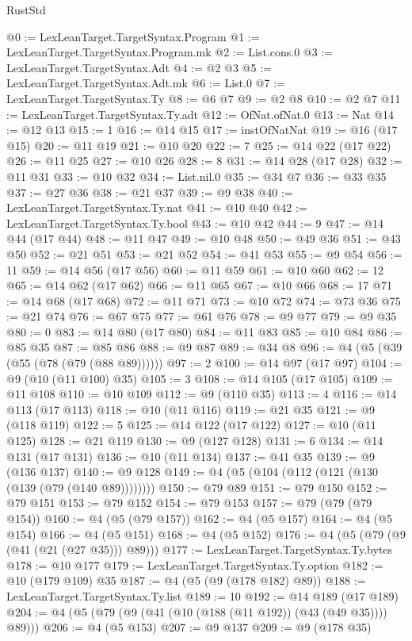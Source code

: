 \begin{lexlean}{RustStd}
\begin{coremodule}
{\begin{coremodule}
{{{{{{{{{{{{{{{{{{{{{{{{{{{{{{{{{@0 := LexLeanTarget.TargetSyntax.Program
@1 := LexLeanTarget.TargetSyntax.Program.mk
@2 := List.cons.{0}
@3 := LexLeanTarget.TargetSyntax.Adt
@4 := @2 @3
@5 := LexLeanTarget.TargetSyntax.Adt.mk
@6 := List.{0}
@7 := LexLeanTarget.TargetSyntax.Ty
@8 := @6 @7
@9 := @2 @8
@10 := @2 @7
@11 := LexLeanTarget.TargetSyntax.Ty.adt
@12 := OfNat.ofNat.{0}
@13 := Nat
@14 := @12 @13
@15 := 1
@16 := @14 @15
@17 := instOfNatNat
@19 := @16 (@17 @15)
@20 := @11 @19
@21 := @10 @20
@22 := 7
@25 := @14 @22 (@17 @22)
@26 := @11 @25
@27 := @10 @26
@28 := 8
@31 := @14 @28 (@17 @28)
@32 := @11 @31
@33 := @10 @32
@34 := List.nil.{0}
@35 := @34 @7
@36 := @33 @35
@37 := @27 @36
@38 := @21 @37
@39 := @9 @38
@40 := LexLeanTarget.TargetSyntax.Ty.nat
@41 := @10 @40
@42 := LexLeanTarget.TargetSyntax.Ty.bool
@43 := @10 @42
@44 := 9
@47 := @14 @44 (@17 @44)
@48 := @11 @47
@49 := @10 @48
@50 := @49 @36
@51 := @43 @50
@52 := @21 @51
@53 := @21 @52
@54 := @41 @53
@55 := @9 @54
@56 := 11
@59 := @14 @56 (@17 @56)
@60 := @11 @59
@61 := @10 @60
@62 := 12
@65 := @14 @62 (@17 @62)
@66 := @11 @65
@67 := @10 @66
@68 := 17
@71 := @14 @68 (@17 @68)
@72 := @11 @71
@73 := @10 @72
@74 := @73 @36
@75 := @21 @74
@76 := @67 @75
@77 := @61 @76
@78 := @9 @77
@79 := @9 @35
@80 := 0
@83 := @14 @80 (@17 @80)
@84 := @11 @83
@85 := @10 @84
@86 := @85 @35
@87 := @85 @86
@88 := @9 @87
@89 := @34 @8
@96 := @4 (@5 (@39 (@55 (@78 (@79 (@88 @89))))))
@97 := 2
@100 := @14 @97 (@17 @97)
@104 := @9 (@10 (@11 @100) @35)
@105 := 3
@108 := @14 @105 (@17 @105)
@109 := @11 @108
@110 := @10 @109
@112 := @9 (@110 @35)
@113 := 4
@116 := @14 @113 (@17 @113)
@118 := @10 (@11 @116)
@119 := @21 @35
@121 := @9 (@118 @119)
@122 := 5
@125 := @14 @122 (@17 @122)
@127 := @10 (@11 @125)
@128 := @21 @119
@130 := @9 (@127 @128)
@131 := 6
@134 := @14 @131 (@17 @131)
@136 := @10 (@11 @134)
@137 := @41 @35
@139 := @9 (@136 @137)
@140 := @9 @128
@149 := @4 (@5 (@104 (@112 (@121 (@130 (@139 (@79 (@140 @89))))))))
@150 := @79 @89
@151 := @79 @150
@152 := @79 @151
@153 := @79 @152
@154 := @79 @153
@157 := @79 (@79 (@79 @154))
@160 := @4 (@5 (@79 @157))
@162 := @4 (@5 @157)
@164 := @4 (@5 @154)
@166 := @4 (@5 @151)
@168 := @4 (@5 @152)
@176 := @4 (@5 (@79 (@9 (@41 (@21 (@27 @35))) @89)))
@177 := LexLeanTarget.TargetSyntax.Ty.bytes
@178 := @10 @177
@179 := LexLeanTarget.TargetSyntax.Ty.option
@182 := @10 (@179 @109) @35
@187 := @4 (@5 (@9 (@178 @182) @89))
@188 := LexLeanTarget.TargetSyntax.Ty.list
@189 := 10
@192 := @14 @189 (@17 @189)
@204 := @4 (@5 (@79 (@9 (@41 (@10 (@188 (@11 @192)) (@43 (@49 @35)))) @89)))
@206 := @4 (@5 @153)
@207 := @9 @137
@209 := @9 (@178 @35)
}}}}}}}}}}}}}}}}}}}}}}}}}}}}}}}}}
\end{coremodule}}
\end{coremodule}
\end{lexlean}
